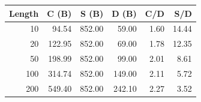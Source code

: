 \begin{tabular}{rrrrrr}
\toprule
\textbf{Length} & \textbf{C (B)} & \textbf{S (B)} & \textbf{D (B)} & \textbf{C/D} & \textbf{S/D} \\
\midrule
10 & 94.54 & 852.00 & 59.00 & 1.60 & 14.44 \\
20 & 122.95 & 852.00 & 69.00 & 1.78 & 12.35 \\
50 & 198.99 & 852.00 & 99.00 & 2.01 & 8.61 \\
100 & 314.74 & 852.00 & 149.00 & 2.11 & 5.72 \\
200 & 549.40 & 852.00 & 242.10 & 2.27 & 3.52 \\
\bottomrule
\end{tabular}
